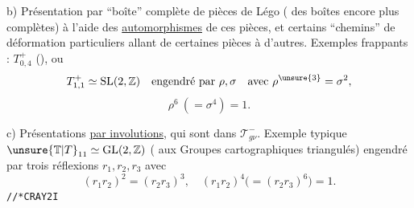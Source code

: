 b) Présentation par ``boîte'' complète de pièces de Légo ( des boîtes encore plus complètes) à l'aide des \uline{automorphismes}  de ces pièces, et certains ``chemins'' de déformation particuliers allant de certaines pièces à d'autres. Exemples frappants : $T_{0,4}^+$ (), ou
\[
T_{1,1}^+\simeq\mathrm{SL}(2,\mathbb Z)\quad\text{engendré par }\rho,\sigma\quad\text{avec }\rho^{\unsure{3}}=\sigma^2,
\]
\[
\rho^6\ (=\sigma^4)=1.
\]

c) Présentations \uline{par involutions}, qui sont dans $\mathcal T_{g\nu}^{-}$. Exemple typique $\unsure{\mathbb T|T}_{11}\simeq\mathrm{GL}(2,\mathbb Z)$  ( aux Groupes cartographiques triangulés) engendré par trois réflexions $r_1,r_2,r_3$ avec
\[
(r_1r_2)^2=(r_2r_3)^3,\quad(r_1r_2)^4\bigl(=(r_2r_3)^6\bigr)=1.
\]
\texttt{//*\quad CRAY2\qquad I}
